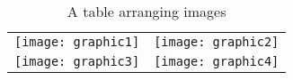 \usepackage{graphicx}

\begin{table}[ht]
\caption{A table arranging  images}
\centering
\begin{tabular}{cc}
\texttt{[image: graphic1]}&\texttt{[image: graphic2]}\\
\texttt{[image: graphic3]}&\texttt{[image: graphic4]}\\
\end{tabular}
\label{tab:gt}
\end{table}
